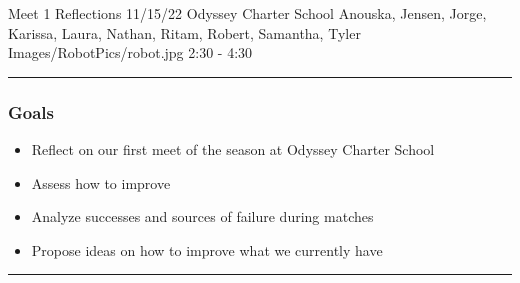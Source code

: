 \insertmeeting 
	{Meet 1 Reflections} 
	{11/15/22} 
	{Odyssey Charter School}
	{Anouska, Jensen, Jorge, Karissa, Laura, Nathan, Ritam, Robert, Samantha, Tyler}
	{Images/RobotPics/robot.jpg}
	{2:30 - 4:30}
	
\noindent\hfil\rule{\textwidth}{.4pt}\hfil
\subsubsection*{Goals}
\begin{itemize}
    \item Reflect on our first meet of the season at Odyssey Charter School
    \item Assess how to improve
    \item Analyze successes and sources of failure during matches
    \item Propose ideas on how to improve what we currently have

\end{itemize} 

\noindent\hfil\rule{\textwidth}{.4pt}\hfil

